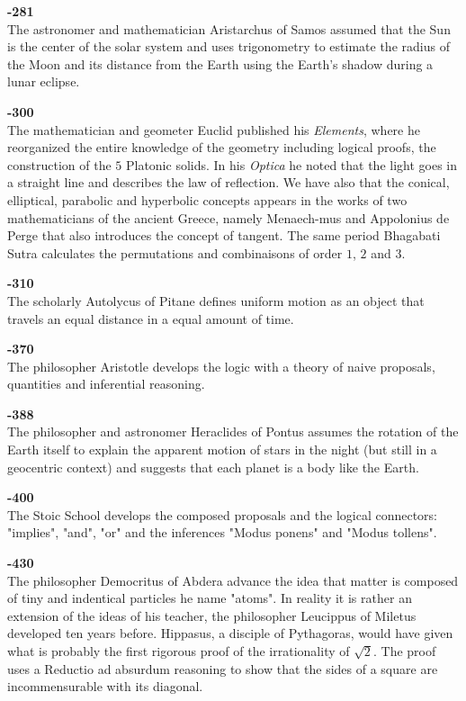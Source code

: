 \textbf{-281}\\
The astronomer and mathematician Aristarchus of Samos assumed that the Sun is the center of the solar system and uses trigonometry to estimate the radius of the Moon and its distance from the Earth using the Earth's shadow during a lunar eclipse.

\textbf{-300}\\
The mathematician and geometer Euclid published his \textit{Elements}, where he reorganized the entire knowledge of the geometry including logical proofs, the construction of the $5$ Platonic solids. In his \textit{Optica} he noted that the light goes in a straight line and describes the law of reflection. We have also that the conical, elliptical, parabolic and hyperbolic concepts appears in the works of two mathematicians of the ancient Greece, namely Menaech-mus and Appolonius de Perge that also introduces the concept of tangent. The same period Bhagabati Sutra calculates the permutations and combinaisons of order $1$, $2$ and $3$.

\textbf{-310}\\
The scholarly Autolycus of Pitane defines uniform motion as an object that travels an equal distance in a equal amount of time.

\textbf{-370}\\
The philosopher Aristotle develops the logic with a theory of naive proposals, quantities and inferential reasoning.

\textbf{-388}\\
The philosopher and astronomer Heraclides of Pontus assumes the rotation of the Earth itself to explain the apparent motion of stars in the night (but still in a geocentric context) and suggests that each planet is a body like the Earth.

\textbf{-400}\\
The Stoic School develops the composed proposals and the logical connectors: "implies", "and", "or" and the inferences "Modus ponens" and "Modus tollens".

\textbf{-430}\\
The philosopher Democritus of Abdera advance the idea that matter is composed of tiny and indentical particles he name "atoms". In reality it is rather an extension of the ideas of his teacher, the philosopher Leucippus of Miletus developed ten years before. Hippasus, a disciple of Pythagoras, would have given what is probably the first rigorous proof of the irrationality of $\sqrt{2}$. The proof uses a Reductio ad absurdum reasoning to show that the sides of a square are incommensurable with its diagonal. 


